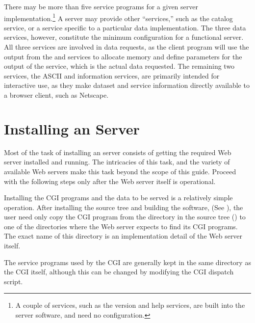 There may be more than five service programs for a given server
implementation.\footnote{A couple of services, such as the version and
  help services, are built into the server software, and need no
  configuration.} A server may provide other ``services,'' such as the
catalog service, or a service specific to a particular data
implementation. The three data services, however, constitute the
minimum configuration for a functional server. All three services are
involved in data requests, as the client program will use the output
from the  and  services to allocate memory and
define parameters for the output of the  service, which is
the actual data requested.  The remaining two services, the ASCII and
information services, are primarily intended for interactive use, as
they make dataset and service information directly available to a
browser client, such as Netscape.

\section{Installing an \opendap Server}
\label{opd-server,install}

Most of the task of installing an \opendap server consists of getting the
required Web server installed and running. The intricacies of this
task, and the variety of available Web servers make this task beyond
the scope of this guide. Proceed with the following steps only after 
the Web server itself is operational.


Installing the \opendap CGI programs and the data to be served is a
\label{opd-server,cgi-install} relatively simple operation. After
installing the \opendap source tree and building the software, (See
), the user need only copy the CGI program from the
 directory in the \opendap source tree ()
to one of the directories where the Web server expects to find its CGI
programs. The exact name of this directory is an implementation detail
of the Web server itself.

The service programs used by the CGI are generally kept in the same
directory as the CGI itself, although this can be changed by modifying
the \opendap CGI dispatch script. 


